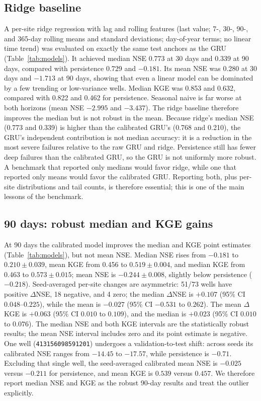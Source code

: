 \documentclass[preprint,12pt]{elsarticle}
\begin{document}
\subsection{Ridge baseline}

A per-site ridge regression with lag and rolling features (last value; 7-, 30-,
90-, and 365-day rolling means and standard deviations; day-of-year terms; no
linear time trend) was evaluated on exactly the same test anchors as the GRU
(Table~\ref{tab:models}).
It achieved median NSE 0.773 at 30 days and 0.339 at 90 days, compared with
persistence 0.729 and $-0.181$. Its mean NSE was 0.280 at 30 days and $-1.713$
at 90 days, showing that even a linear model can be dominated by a few trending
or low-variance wells. Median KGE was 0.853 and 0.632, compared with 0.822 and
0.462 for persistence. Seasonal naive is far worse at both horizons (mean NSE
$-2.995$ and $-3.437$). The ridge baseline therefore improves the median but is
not robust in the mean. Because ridge's median NSE (0.773 and 0.339) is higher
than the calibrated GRU's (0.768 and 0.210), the GRU's independent contribution
is not median accuracy: it is a reduction in the most severe failures relative
to the raw GRU and ridge. Persistence still has fewer deep failures than the
calibrated GRU, so the GRU is not uniformly more robust. A benchmark that
reported only medians would favor ridge, while one that reported only means
would favor the calibrated GRU. Reporting both, plus per-site distributions and
tail counts, is therefore essential; this is one of the main lessons of the
benchmark.

\subsection{90 days: robust median and KGE gains}

At 90 days the calibrated model improves the median and KGE point estimates
(Table~\ref{tab:models}), but not mean NSE. Median NSE rises from $-0.181$ to
$0.210 \pm 0.039$, mean KGE from 0.456 to $0.519 \pm 0.004$, and median KGE
from 0.463 to $0.573 \pm 0.015$; mean NSE is $-0.244 \pm 0.008$, slightly below
persistence ($-0.218$). Seed-averaged per-site changes are asymmetric: 51/73
wells have positive $\Delta$NSE, 18 negative, and 4 zero; the median
$\Delta$NSE is $+0.107$ (95\% CI $0.048$--$0.225$), while the mean is $-0.027$
(95\% CI $-0.531$ to $0.262$). The mean $\Delta$KGE is $+0.063$ (95\% CI
$0.010$ to $0.109$), and the median is $+0.023$ (95\% CI $0.010$ to $0.076$).
The median NSE and both KGE intervals are the statistically robust results; the
mean NSE interval includes zero and its point estimate is negative. One well
(\texttt{413156098591201}) undergoes a validation-to-test shift: across seeds
its calibrated NSE ranges from $-14.45$ to $-17.57$, while persistence is
$-0.71$. Excluding that single well, the seed-averaged calibrated mean NSE is
$-0.025$ versus $-0.211$ for persistence, and mean KGE is $0.539$ versus
$0.457$. We therefore report median NSE and KGE as the robust 90-day results
and treat the outlier explicitly.
\end{document}
